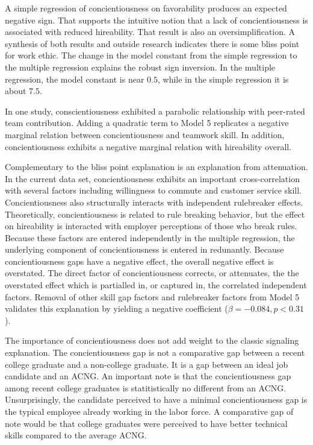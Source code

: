 \documentclass[review]{elsarticle}
\begin{document}
A simple regression of concientiousness on favorability produces an expected negative sign.
That supports the intuitive notion that a lack of concientiousness is associated with reduced hireability.
That result is also an oversimplification.
A synthesis of both results and outside research indicates there is some bliss point for work ethic.
The change in the model constant from the simple regression to the multiple regression explains the robust sign inversion.
In the multiple regression, the model constant is near $0.5$, while in the simple regression it is about $7.5$.

In one study, conscientiousness exhibited a parabolic relationship with peer-rated team contribution\cite{curcseu2019personality}.
Adding a quadratic term to Model 5 replicates a negative marginal relation between concientiousness and teamwork skill.
In addition, concientiousness exhibits a negative marginal relation with hireability overall.

Complementary to the bliss point explanation is an explanation from attenuation.
In the current data set, concientiousness exhibits an important cross-correlation with several factors including willingness to commute and customer service skill.
Concientiousness also structurally interacts with independent rulebreaker effects.
Theoretically, concientiousness is related to rule breaking behavior, but the effect on hireability is interacted with employer perceptions of those who break rules.
Because these factors are entered independently in the multiple regression, the underlying component of concientiousness is entered in redunantly.
Because concientiousness gaps have a negative effect, the overall negative effect is overstated.
The direct factor of concientiousness corrects, or attenuates, the the overstated effect which is partialled in, or captured in, the correlated independent factors.
Removal of other skill gap factors and rulebreaker factors from Model 5 validates this explanation by yielding a negative coefficient ($\beta = -0.084, p < 0.31$).

The importance of concientiousness does not add weight to the classic signaling explanation.
The concientiousness gap is not a comparative gap between a recent college graduate and a non-college graduate.
It is a gap between an ideal job candidate and an ACNG.
An important note is that the concientiousness gap among recent college graduates is statitistically no different from an ACNG.
Unsurprisingly, the candidate perceived to have a minimal concientiousness gap is the typical employee already working in the labor force.
A comparative gap of note would be that college graduates were perceived to have better technical skills compared to the average ACNG.
\end{document}
